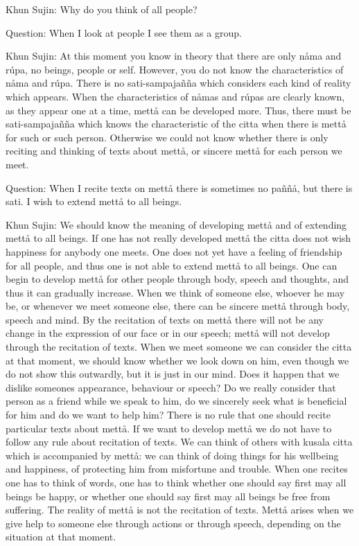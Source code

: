 \documentclass[12pt,twoside]{article}
\begin{document}
Khun Sujin: Why do you think of all people?

Question: When I look at people I see them as a group. 

Khun Sujin: At this moment you know in theory that there are only
n{\aa}ma and r\'upa, no beings, people or self. However, you do not
know the characteristics of n{\aa}ma and r\'upa. There is no
sati{}-sampaja\~n\~na which considers each kind of reality which
appears. When the characteristics of n{\aa}mas and r\'upas are clearly
known, as they appear one at a time, mett{\aa} can be developed more.
Thus, there must be sati{}-sampaja\~n\~na which knows the
characteristic of the citta when there is mett{\aa} for such or such
person. Otherwise we could not know whether there is only reciting and
thinking of texts about mett{\aa}, or sincere mett{\aa} for each person
we meet. 

Question: When I recite texts on mett{\aa} there is sometimes no
pa\~n\~n{\aa}, but there is sati. I wish to extend mett{\aa} to all
beings. 

Khun Sujin: We should know the meaning of
{\textasciigrave}{\textasciigrave}developing
mett{\aa}{\textquotesingle}{\textquotesingle} and of
{\textasciigrave}{\textasciigrave}extending mett{\aa} to all
beings.{\textquotesingle}{\textquotesingle} If one has not really
developed mett{\aa} the citta does not wish happiness for anybody one
meets. One does not yet have a feeling of friendship for all people,
and thus one is not able to extend mett{\aa} to all beings. One can
begin to develop mett{\aa} for other people through body, speech and
thoughts, and thus it can gradually increase. When we think of someone
else, whoever he may be, or whenever we meet someone else, there can be
sincere mett{\aa} through body, speech and mind. By the recitation of
texts on mett{\aa} there will not be any change in the expression of
our face or in our speech; mett{\aa} will not develop through the
recitation of texts. When we meet someone we can consider the citta at
that moment, we should know whether we look down on him, even though we
do not show this outwardly, but it is just in our mind. Does it happen
that we dislike someone{\textquotesingle}s appearance, behaviour or
speech? Do we really consider that person as a friend while we speak to
him, do we sincerely seek what is beneficial for him and do we want to
help him? There is no rule that one should recite particular texts
about mett{\aa}. If we want to develop mett{\aa} we do not have to
follow any rule about recitation of texts. We can think of others with
kusala citta which is accompanied by mett{\aa}: we can think of doing
things for his wellbeing and happiness, of protecting him from
misfortune and trouble. When one recites one has to think of words, one
has to think whether one should say first
{\textasciigrave}{\textasciigrave}may all beings be
happy{\textquotesingle}{\textquotesingle}, or whether one should say
first {\textasciigrave}{\textasciigrave}may all beings be free from
suffering{\textquotesingle}{\textquotesingle}. The reality of mett{\aa}
is not the recitation of texts. Mett{\aa} arises when we give help to
someone else through actions or through speech, depending on the
situation at that moment. 
\end{document}
